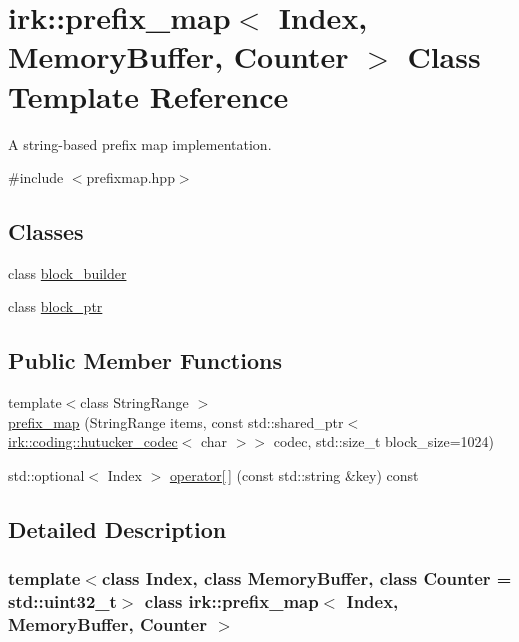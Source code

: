 \hypertarget{classirk_1_1prefix__map}{}\section{irk\+:\+:prefix\+\_\+map$<$ Index, Memory\+Buffer, Counter $>$ Class Template Reference}
\label{classirk_1_1prefix__map}


A string-\/based prefix map implementation.  




{\ttfamily \#include $<$prefixmap.\+hpp$>$}

\subsection*{Classes}
\begin{DoxyCompactItemize}
\item 
class \mbox{\hyperlink{classirk_1_1prefix__map_1_1block__builder}{block\+\_\+builder}}
\item 
class \mbox{\hyperlink{classirk_1_1prefix__map_1_1block__ptr}{block\+\_\+ptr}}
\end{DoxyCompactItemize}
\subsection*{Public Member Functions}
\begin{DoxyCompactItemize}
\item 
{\footnotesize template$<$class String\+Range $>$ }\\\mbox{\hyperlink{classirk_1_1prefix__map_a0fbeb344ad4a076d200023a9fc72d359}{prefix\+\_\+map}} (String\+Range items, const std\+::shared\+\_\+ptr$<$ \mbox{\hyperlink{classirk_1_1coding_1_1hutucker__codec}{irk\+::coding\+::hutucker\+\_\+codec}}$<$ char $>$$>$ codec, std\+::size\+\_\+t block\+\_\+size=1024)
\item 
std\+::optional$<$ Index $>$ \mbox{\hyperlink{classirk_1_1prefix__map_af8c0c9c8a7bc1b31d03111e714aaec2b}{operator\mbox{[}$\,$\mbox{]}}} (const std\+::string \&key) const
\end{DoxyCompactItemize}


\subsection{Detailed Description}
\subsubsection*{template$<$class Index, class Memory\+Buffer, class Counter = std\+::uint32\+\_\+t$>$\newline
class irk\+::prefix\+\_\+map$<$ Index, Memory\+Buffer, Counter $>$}

